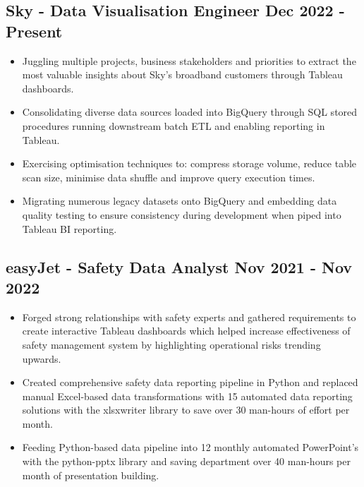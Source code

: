 \documentclass[a4paper,9pt]{article}
\begin{document}
\subsection*{\textbf{Sky - Data Visualisation Engineer} \hfill  Dec 2022 - Present}
\begin{itemize}[noitemsep]
    \item Juggling multiple projects, business stakeholders and priorities to extract the most valuable insights about Sky's broadband customers through Tableau dashboards.
    \item Consolidating diverse data sources loaded into BigQuery through SQL stored procedures running downstream batch ETL and enabling reporting in Tableau.
    \item Exercising optimisation techniques to: compress storage volume, reduce table scan size, minimise data shuffle and improve query execution times.
    \item Migrating numerous legacy datasets onto BigQuery and embedding data quality testing to ensure consistency during development when piped into Tableau BI reporting.
\end{itemize}

\subsection*{\textbf{easyJet - Safety Data Analyst} \hfill  Nov 2021 - Nov 2022}
\begin{itemize}[noitemsep]
    \item Forged strong relationships with safety experts and gathered requirements to create interactive Tableau dashboards which helped increase effectiveness of safety management system by highlighting operational risks trending upwards.
    \item Created comprehensive safety data reporting pipeline in Python and replaced manual Excel-based data transformations with 15 automated data reporting solutions with the xlsxwriter library to save over 30 man-hours of effort per month.
    \item Feeding Python-based data pipeline into 12 monthly automated PowerPoint's with the python-pptx library and saving department over 40 man-hours per month of presentation building.
\end{itemize}
\end{document}
